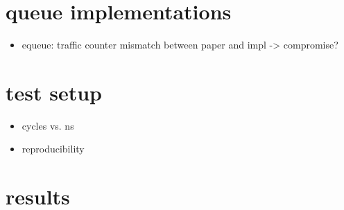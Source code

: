 \documentclass{article}
\begin{document}


\section{queue implementations}
\begin{itemize}
    \item equeue: traffic counter mismatch between paper and impl -> compromise?
\end{itemize}

\section{test setup}
\begin{itemize}
    \item cycles vs. ns
    \item reproducibility
\end{itemize}

\section{results}
\end{document}
